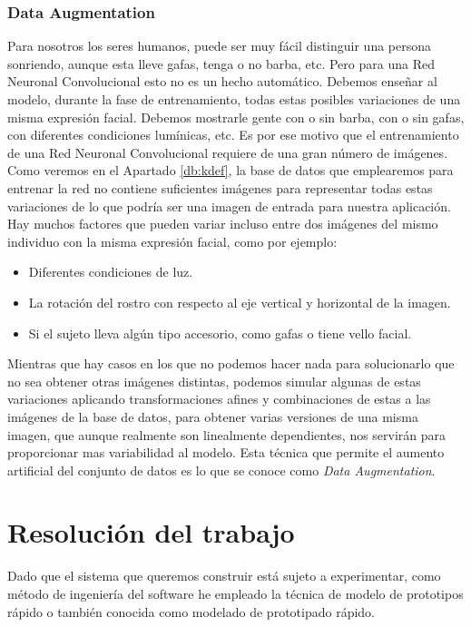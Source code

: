 \documentclass[a4paper,11pt]{book}
\begin{document}
\subsection{Data Augmentation}\label{sub:data-augmentation}
Para nosotros los seres humanos, puede ser muy fácil distinguir una persona sonriendo, aunque esta lleve gafas, tenga o no barba, etc. Pero para una Red Neuronal Convolucional esto no es un hecho automático. Debemos enseñar al modelo, durante la fase de entrenamiento, todas estas posibles variaciones de una misma expresión facial. Debemos mostrarle gente con o sin barba, con o sin gafas, con diferentes condiciones lumínicas, etc. Es por ese motivo que el entrenamiento de una Red Neuronal Convolucional requiere de una gran número de imágenes. \\
Como veremos en el Apartado \ref{db:kdef}, la base de datos que emplearemos para entrenar la red no contiene suficientes imágenes para representar todas estas variaciones de lo que podría ser una imagen de entrada para nuestra aplicación. Hay muchos factores que pueden variar incluso entre dos imágenes del mismo individuo con la misma expresión facial, como por ejemplo:
\begin{itemize}
	\item Diferentes condiciones de luz.
	\item La rotación del rostro con respecto al eje vertical y horizontal de la imagen.
	\item Si el sujeto lleva algún tipo accesorio, como gafas o tiene vello facial.
\end{itemize}
Mientras que hay casos en los que no podemos hacer nada para solucionarlo que no sea obtener otras imágenes distintas, podemos simular algunas de estas variaciones aplicando transformaciones afines y combinaciones de estas a las imágenes de la base de datos, para obtener varias versiones de una misma imagen, que aunque realmente son linealmente dependientes, nos servirán para proporcionar mas variabilidad al modelo. Esta técnica que permite el aumento artificial del conjunto de datos es lo que se conoce como \textit{Data Augmentation}.


\chapter{Resolución del trabajo}
Dado que el sistema que queremos construir está sujeto a experimentar, como método de ingeniería del software he empleado la técnica de modelo de prototipos rápido o también conocida como modelado de prototipado rápido\cite{ecured_a}.
\end{document}
